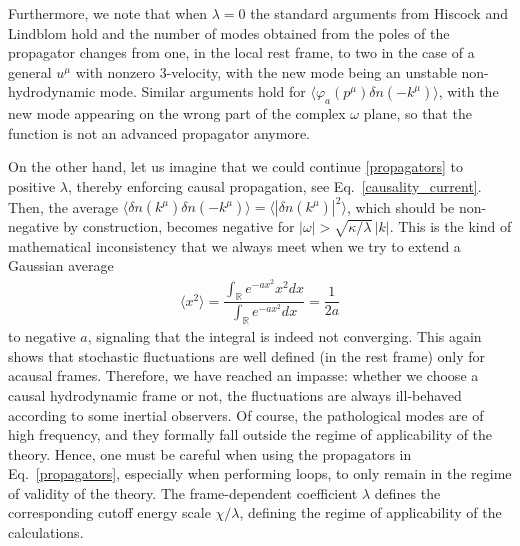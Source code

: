 \documentclass[aps,prd,nofootinbib,amsmath,amssymb,showpacs,longbibliography,singlecolumn,superscriptaddress,notitlepage]{revtex4-1}
\theoremstyle{plain}
\theoremstyle{definition}
\begin{document}
Furthermore, we note that when $\lambda=0$ the standard arguments from Hiscock and Lindblom \cite{Hiscock:1985zz} hold and the number of modes obtained from the poles of the propagator changes from one, in the local rest frame, to two in the case of a general $u^\mu$ with nonzero 3-velocity, with the new mode being an unstable non-hydrodynamic mode.  
Similar arguments hold for $\langle \varphi_a(p^{\mu})\delta n(-k^{\mu}) \rangle$, with the new mode appearing on the wrong part of the complex $\omega$ plane, so that the function is not an advanced propagator anymore. 

On the other hand, let us imagine that we could continue \eqref{propagators} to positive $\lambda$, thereby enforcing causal propagation, see Eq.\ \eqref{causality_current}. Then, the average $\langle \delta n(k^{\mu}) \delta n(-k^{\mu})\rangle=\langle |\delta n(k^{\mu})|^2\rangle$, which should be non-negative by construction, becomes negative for $|\omega|>\sqrt{\kappa/\lambda}\, |k|$. This is the kind of mathematical inconsistency that we always meet when we try to extend a Gaussian average
\begin{eqnarray}
  \langle x^2 \rangle =  \dfrac{\int_\mathbb{R} e^{-ax^2} x^2 dx}{\int_\mathbb{R} e^{-ax^2}  dx} = \dfrac{1}{2a} 
\end{eqnarray}
to negative $a$, signaling that the integral is indeed not converging. This again shows that stochastic fluctuations are well defined (in the rest frame) only for acausal frames. Therefore, we have reached an impasse: whether we choose a causal hydrodynamic frame or not, the fluctuations are always ill-behaved according to some inertial observers. Of course, the pathological modes are of high frequency, and they formally fall outside the regime of applicability of the theory. Hence, one must be careful when using the propagators in Eq.\ \eqref{propagators}, especially when performing loops, to only remain in the regime of validity of the theory. The frame-dependent coefficient $\lambda$ defines the corresponding cutoff energy scale $\chi/\lambda$, defining the regime of applicability of the calculations. 
\end{document}
